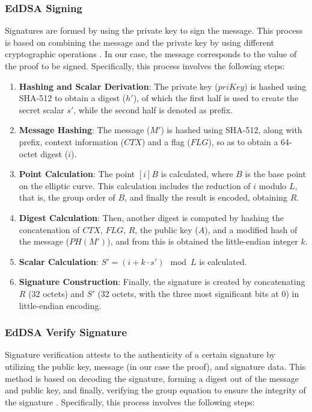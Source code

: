 \subsubsection{EdDSA Signing}

Signatures are formed by using the private key to sign the message. This process is based on combining the message and the private key by using different cryptographic 
operations \cite{10054286}. In our case, the message corresponds to the value of the proof to be signed. Specifically, this process involves the following steps:

\begin{enumerate}
  \item \textbf{Hashing and Scalar Derivation}: The private key ($priKey$) is hashed using SHA-512 to obtain a digest ($h'$), of which the first half is used to create the 
  secret scalar $s'$, while the second half is denoted as prefix.
  \item \textbf{Message Hashing}: The message ($M'$) is hashed using SHA-512, along with prefix, context information ($CTX$) and a flag ($FLG$), so as to obtain a 64-octet 
  digest ($i$).
  \item \textbf{Point Calculation}: The point $[i]B$ is calculated, where $B$ is the base point on the elliptic curve. This calculation includes the reduction of 
  $i$ modulo $L$, that is, the group order of $B$, and finally the result is encoded, obtaining $R$.
  \item \textbf{Digest Calculation}: Then, another digest is computed by hashing the concatenation of $CTX$, $FLG$, $R$, the public key ($A$), and a modified hash of the message 
  ($PH(M')$), and from this is obtained the little-endian integer $k$.
  \item \textbf{Scalar Calculation}: $S' = (i + k \cdot s') \mod L$ is calculated.
  \item \textbf{Signature Construction}: Finally, the signature is created by concatenating $R$ (32 octets) and $S'$ (32 octets, with the three most significant bits at $0$) 
  in little-endian encoding.
\end{enumerate}

\subsubsection{EdDSA Verify Signature}

Signature verification attests to the authenticity of a certain signature by utilizing the public key, message (in our case the proof), and signature data. This method is 
based on decoding the signature, forming a digest out of the message and public key, and finally, verifying the group equation to ensure the integrity of the signature \cite{10054286}. 
Specifically, this process involves the following steps:


